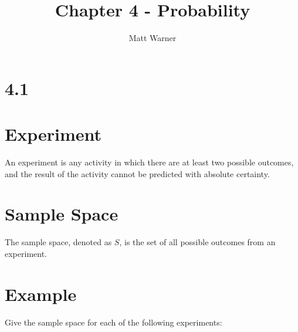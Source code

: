 \documentclass{report}
\title{\Huge{Chapter 4 - Probability}}
\author{\huge{Matt Warner}}
\date{\huge{}}
\begin{document}
  \maketitle

  \section*{4.1} 
  \begin{mdframed}
\section*{Experiment}
An experiment is any activity in which there are at least two possible outcomes, and the result of the activity cannot be predicted with absolute certainty.

\section*{Sample Space}
The sample space, denoted as $S$, is the set of all possible outcomes from an experiment.
  \end{mdframed}
  \bigbreak \noindent
\section*{Example}
Give the sample space for each of the following experiments:
\end{document}
